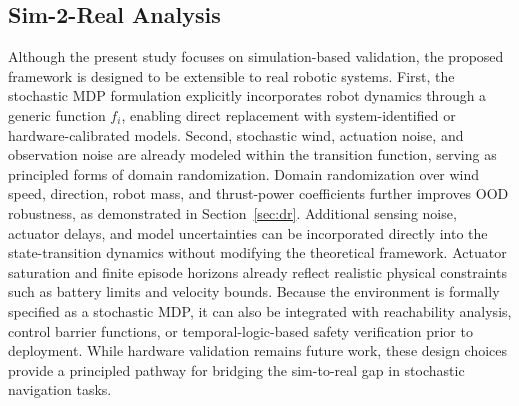 \documentclass{article}
\begin{document}
\subsection{Sim-2-Real Analysis}
Although the present study focuses on simulation-based validation, the proposed framework is designed to be extensible to real robotic systems. First, the stochastic MDP formulation explicitly incorporates robot dynamics through a generic function $f_i$, enabling direct replacement with system-identified or hardware-calibrated models. Second, stochastic wind, actuation noise, and observation noise are already modeled within the transition function, serving as principled forms of domain randomization. Domain randomization over wind speed, direction, robot mass, and thrust-power coefficients further improves OOD robustness, as demonstrated in Section~\ref{sec:dr}. Additional sensing noise, actuator delays, and model uncertainties can be incorporated directly into the state-transition dynamics without modifying the theoretical framework. Actuator saturation and finite episode horizons already reflect realistic physical constraints such as battery limits and velocity bounds. Because the environment is formally specified as a stochastic MDP, it can also be integrated with reachability analysis, control barrier functions, or temporal-logic-based safety verification prior to deployment. While hardware validation remains future work, these design choices provide a principled pathway for bridging the sim-to-real gap in stochastic navigation tasks.
\end{document}
